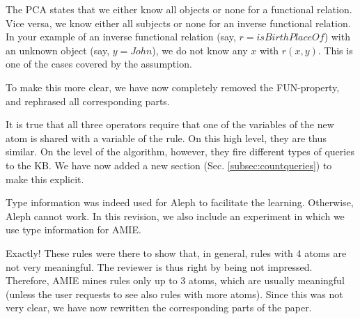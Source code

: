 
The PCA states that we either know all objects or none for a functional relation. Vice versa, we know either all subjects or none for an inverse functional relation. In your example of an inverse functional relation (say, $r=isBirthPlaceOf$) with an unknown object (say, $y=John$), we do not know any $x$ with $r(x,y)$. This is one of the cases covered by the assumption.

To make this more clear, we have now completely removed the FUN-property, and rephrased all corresponding parts.



It is true that all three operators require that one of the variables of the new atom is shared with a variable of the rule. On this high level, they are thus similar. On the level of the algorithm, however, they fire different types of queries to the KB. We have now added a new section (Sec. \ref{subsec:countqueries}) to make this explicit.


      Type information was indeed used for Aleph to facilitate the learning. Otherwise, Aleph cannot work.
      In this revision, we also include an experiment in which we use type information for AMIE.


Exactly! These rules were there to show that, in general, rules with 4 atoms are not very meaningful. The reviewer is thus right by being not impressed. Therefore, AMIE mines rules only up to 3 atoms, which are usually meaningful (unless the user requests to see also rules with more atoms). Since this was not very clear, we have now rewritten the corresponding parts of the paper.

